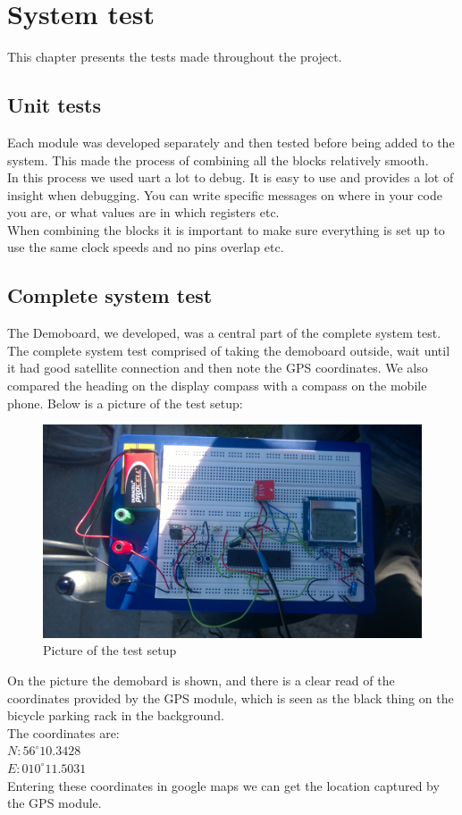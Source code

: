 \chapter{System test}
This chapter presents the tests made throughout the project. 

\section{Unit tests}
Each module was developed separately and then tested before being added to the system. This made the process of combining all the blocks relatively smooth.\\
In this process we used uart a lot to debug. It is easy to use and provides a lot of insight when debugging. You can write specific messages on where in your code you are, or what values are in which registers etc.\\
When combining the blocks it is important to make sure everything is set up to use the same clock speeds and no pins overlap etc.

\section{Complete system test}
The Demoboard, we developed, was a central part of the complete system test. The complete system test comprised of taking the demoboard outside, wait until it had good satellite connection and then note the GPS coordinates. We also compared the heading on the display compass with a compass on the mobile phone. Below is a picture of the test setup:
\begin{figure}[H]
\centering
\includegraphics[width=.9\textwidth]{billeder/test_setup}
\caption{Picture of the test setup}
\end{figure}
On the picture the demobard is shown, and there is a clear read of the coordinates provided by the GPS module, which is seen as the black thing on the bicycle parking rack in the background.\\
The coordinates are:\\
$N:56^{\circ}10.3428$\\
$E:010^{\circ}11.5031$\\
Entering these coordinates in google maps we can get the location captured by the GPS module.


